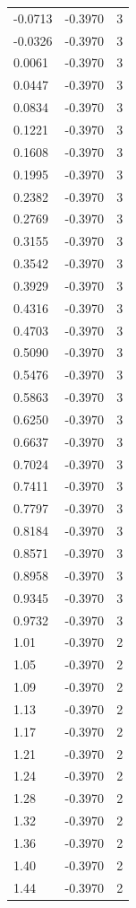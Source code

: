 \begin{longtable}{lrr}
  -0.0713 & -0.3970 & 3 \\
  -0.0326 & -0.3970 & 3 \\
  0.0061 & -0.3970 & 3 \\
  0.0447 & -0.3970 & 3 \\
  0.0834 & -0.3970 & 3 \\
  0.1221 & -0.3970 & 3 \\
  0.1608 & -0.3970 & 3 \\
  0.1995 & -0.3970 & 3 \\
  0.2382 & -0.3970 & 3 \\
  0.2769 & -0.3970 & 3 \\
  0.3155 & -0.3970 & 3 \\
  0.3542 & -0.3970 & 3 \\
  0.3929 & -0.3970 & 3 \\
  0.4316 & -0.3970 & 3 \\
  0.4703 & -0.3970 & 3 \\
  0.5090 & -0.3970 & 3 \\
  0.5476 & -0.3970 & 3 \\
  0.5863 & -0.3970 & 3 \\
  0.6250 & -0.3970 & 3 \\
  0.6637 & -0.3970 & 3 \\
  0.7024 & -0.3970 & 3 \\
  0.7411 & -0.3970 & 3 \\
  0.7797 & -0.3970 & 3 \\
  0.8184 & -0.3970 & 3 \\
  0.8571 & -0.3970 & 3 \\
  0.8958 & -0.3970 & 3 \\
  0.9345 & -0.3970 & 3 \\
  0.9732 & -0.3970 & 3 \\
  1.01 & -0.3970 & 2 \\
  1.05 & -0.3970 & 2 \\
  1.09 & -0.3970 & 2 \\
  1.13 & -0.3970 & 2 \\
  1.17 & -0.3970 & 2 \\
  1.21 & -0.3970 & 2 \\
  1.24 & -0.3970 & 2 \\
  1.28 & -0.3970 & 2 \\
  1.32 & -0.3970 & 2 \\
  1.36 & -0.3970 & 2 \\
  1.40 & -0.3970 & 2 \\
  1.44 & -0.3970 & 2 \\

\end{longtable}
